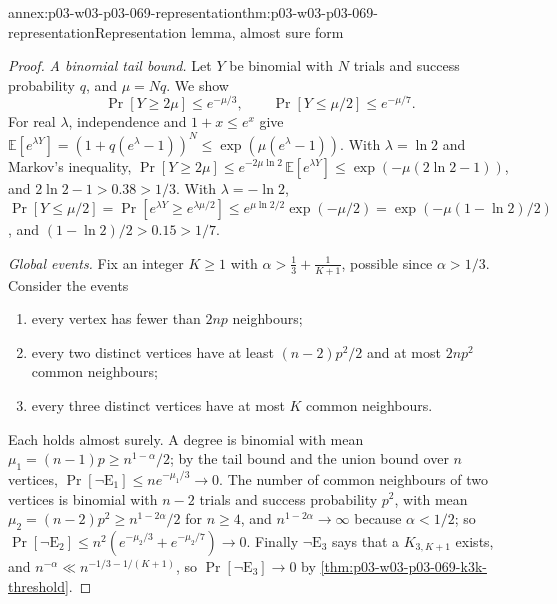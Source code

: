 \begin{annexitem}{annex:p03-w03-p03-069-representation}{thm:p03-w03-p03-069-representation}{Representation lemma, almost sure form}
\begin{proof}
\emph{A binomial tail bound.}  Let \(Y\) be binomial with \(N\) trials and
success probability \(q\), and \(\mu=Nq\).  We show
\[
  \Pr[Y\geq2\mu]\leq e^{-\mu/3},\qquad\Pr[Y\leq\mu/2]\leq e^{-\mu/7}.
\]
For real \(\lambda\), independence and \(1+x\leq e^x\) give
\(\mathbb E[e^{\lambda Y}]=(1+q(e^\lambda-1))^N\leq\exp(\mu(e^\lambda-1))\).
With \(\lambda=\ln2\) and Markov's inequality,
\(\Pr[Y\geq2\mu]\leq e^{-2\mu\ln2}\,\mathbb E[e^{\lambda Y}]\leq
\exp(-\mu(2\ln2-1))\), and \(2\ln2-1>0.38>1/3\).  With \(\lambda=-\ln2\),
\(\Pr[Y\leq\mu/2]=\Pr[e^{\lambda Y}\geq e^{\lambda\mu/2}]\leq
e^{\mu\ln2/2}\exp(-\mu/2)=\exp(-\mu(1-\ln2)/2)\), and
\((1-\ln2)/2>0.15>1/7\).

\emph{Global events.}  Fix an integer \(K\geq1\) with
\(\alpha>\tfrac13+\tfrac1{K+1}\), possible since \(\alpha>1/3\).  Consider
the events
\begin{enumerate}
\item[\(\mathrm E_1\):] every vertex has fewer than \(2np\) neighbours;
\item[\(\mathrm E_2\):] every two distinct vertices have at least
\((n-2)p^2/2\) and at most \(2np^2\) common neighbours;
\item[\(\mathrm E_3\):] every three distinct vertices have at most \(K\)
common neighbours.
\end{enumerate}
Each holds almost surely.  A degree is binomial with mean
\(\mu_1=(n-1)p\geq n^{1-\alpha}/2\); by the tail bound and the union bound
over \(n\) vertices, \(\Pr[\neg\mathrm E_1]\leq ne^{-\mu_1/3}\to0\).  The
number of common neighbours of two vertices is binomial with \(n-2\) trials
and success probability \(p^2\), with mean
\(\mu_2=(n-2)p^2\geq n^{1-2\alpha}/2\) for \(n\geq4\), and
\(n^{1-2\alpha}\to\infty\) because \(\alpha<1/2\); so
\(\Pr[\neg\mathrm E_2]\leq n^2(e^{-\mu_2/3}+e^{-\mu_2/7})\to0\).  Finally
\(\neg\mathrm E_3\) says that a \(K_{3,K+1}\) exists, and
\(n^{-\alpha}\ll n^{-1/3-1/(K+1)}\), so
\(\Pr[\neg\mathrm E_3]\to0\) by \cref{thm:p03-w03-p03-069-k3k-threshold}.


\end{proof}
\end{annexitem}
